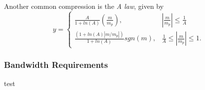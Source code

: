 \documentclass[]{article}
\begin{document}
Another common compression is the \textit{A law}, given by
\begin{equation} y=\begin{cases}
\frac{A}{1+ln(A)}( \frac{m}{m_{p}}), & |\frac{m}{m_{p}}|\leq \frac{1}{A}\\
\frac{(1+ln(A)|m/m_{p}|)}{1+ln(A)}sgn(m), & \frac{1}{A}\leq |\frac{m}{m_{p}}|\leq 1.
\end{cases} \end{equation}
\subsubsection{Bandwidth Requirements}
test







\end{document}
